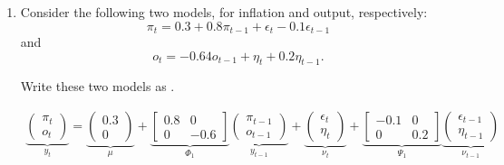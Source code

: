 \begin{enumerate}
    \item Consider the following two \armapq[1, 1]{} models, for inflation and output, respectively:
          \[ \pi_t = 0.3 + 0.8 \pi_{t-1} + \epsilon_t - 0.1 \epsilon_{t-1} \]
          and
          \[ o_t = -0.64 o_{t-1} + \eta_t + 0.2 \eta_{t-1}. \]

          Write these two \armapq[1, 1]{} models as \varmapq[1, 1]{}.

          \begin{sol}
              \begin{align*}
                  \underbrace{
                      \begin{pmatrix}
                          \pi_t \\ o_t
                      \end{pmatrix}
                  }_{
                      y_t
                  }
                  = \underbrace{
                      \begin{pmatrix} 0.3 \\ 0 \end{pmatrix}
                  }_{
                      \mu
                  }
                  + \underbrace{
                      \begin{bmatrix}
                          0.8 & 0    \\
                          0   & -0.6
                      \end{bmatrix}
                  }_{
                      \Phi_1
                  }
                  \underbrace{
                      \begin{pmatrix}
                          \pi_{t-1} \\ o_{t-1}
                      \end{pmatrix}
                  }_{
                  y_{t-1}
                  }
                  + \underbrace{
                      \begin{pmatrix}
                          \epsilon_{t} \\ \eta_{t}
                      \end{pmatrix}
                  }_{
                      \nu_t
                  }
                  + \underbrace{
                      \begin{bmatrix}
                          -0.1 & 0   \\
                          0    & 0.2
                      \end{bmatrix}
                  }_{
                      \Psi_1
                  }
                  \underbrace{
                      \begin{pmatrix}
                          \epsilon_{t-1} \\ \eta_{t-1}
                      \end{pmatrix}
                  }_{
                  \nu_{t-1}
                  }
              \end{align*}
          \end{sol}


\end{enumerate}

